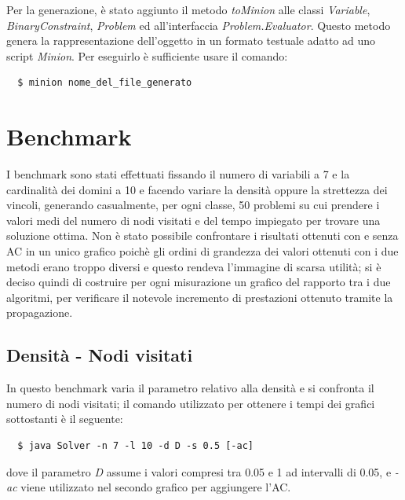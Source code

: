 \documentclass[a4paper,12pt,italian]{article}
\begin{document}
Per la generazione, \`e stato aggiunto il metodo \textit{toMinion}
alle classi \textit{Variable}, \textit{BinaryConstraint},
\textit{Problem} ed all'interfaccia \textit{Problem.Evaluator}. Questo
metodo genera la rappresentazione dell'oggetto in un formato testuale
adatto ad uno script \textit{Minion}. Per eseguirlo \`e sufficiente
usare il comando:

\begin{verbatim}
  $ minion nome_del_file_generato
\end{verbatim}

\section{Benchmark}
I benchmark sono stati effettuati fissando il numero di variabili a 7 e la
cardinalit\`a dei domini a 10 e facendo variare la densit\`a oppure la strettezza
dei vincoli, generando casualmente, per ogni classe, 50
problemi su cui prendere i valori medi del numero di nodi
visitati e del tempo
impiegato per trovare una soluzione ottima. Non \`e stato possibile confrontare i risultati
ottenuti con e senza AC in un unico grafico poich\`e gli ordini di
grandezza dei valori ottenuti con i due metodi erano troppo
diversi e questo rendeva l'immagine di scarsa utilit\`a; si \`e deciso quindi di costruire 
per ogni misurazione un grafico del rapporto tra i due algoritmi, per verificare il notevole 
incremento di prestazioni ottenuto tramite la propagazione.

\subsection{Densit\`a - Nodi visitati}
In questo benchmark varia il parametro relativo alla densit\`a e si
confronta il numero di nodi visitati; il comando utilizzato per
ottenere i tempi dei grafici sottostanti
\`e il seguente:
\begin{verbatim}
  $ java Solver -n 7 -l 10 -d D -s 0.5 [-ac]
\end{verbatim}
dove il parametro \textit{D} assume i valori compresi tra 0.05 e 1 ad intervalli di 0.05,
e \textit{-ac} viene utilizzato nel secondo grafico per aggiungere l'AC.
\end{document}
